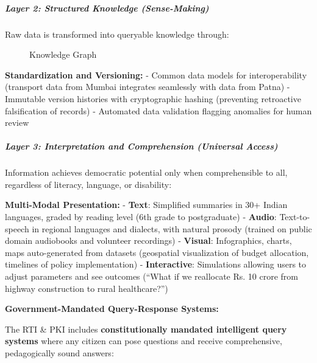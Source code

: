 \subparagraph{Layer 2: Structured Knowledge
(Sense-Making)}\label{layer-2-structured-knowledge-sense-making}

Raw data is transformed into queryable knowledge through:

\begin{figure}
\centering
\pandocbounded{}
\caption{Knowledge Graph}
\end{figure}

\textbf{Standardization and Versioning:} - Common data models for
interoperability (transport data from Mumbai integrates seamlessly with
data from Patna) - Immutable version histories with cryptographic
hashing (preventing retroactive falsification of records) - Automated
data validation flagging anomalies for human review

\subparagraph{Layer 3: Interpretation and Comprehension (Universal
Access)}\label{layer-3-interpretation-and-comprehension-universal-access}

Information achieves democratic potential only when comprehensible to
all, regardless of literacy, language, or disability:

\textbf{Multi-Modal Presentation:} - \textbf{Text}: Simplified summaries
in 30+ Indian languages, graded by reading level (6th grade to
postgraduate) - \textbf{Audio}: Text-to-speech in regional languages and
dialects, with natural prosody (trained on public domain audiobooks and
volunteer recordings) - \textbf{Visual}: Infographics, charts, maps
auto-generated from datasets (geospatial visualization of budget
allocation, timelines of policy implementation) - \textbf{Interactive}:
Simulations allowing users to adjust parameters and see outcomes (``What
if we reallocate Rs. 10 crore from highway construction to rural
healthcare?'')

\textbf{Government-Mandated Query-Response Systems:}

The RTI \& PKI includes \textbf{constitutionally mandated intelligent
query systems} where any citizen can pose questions and receive
comprehensive, pedagogically sound answers:

